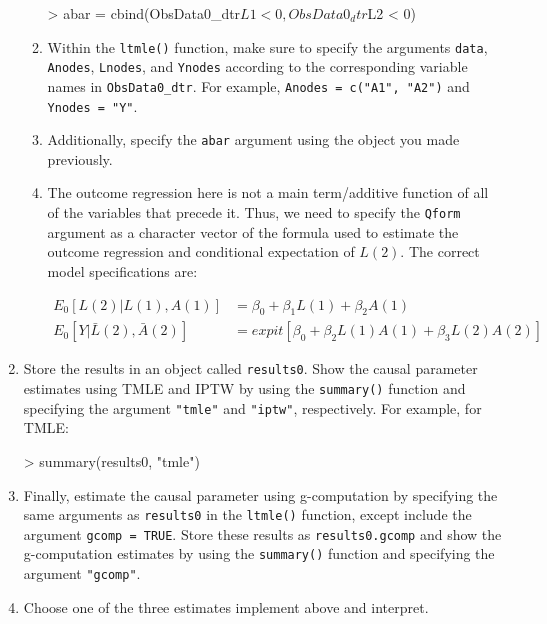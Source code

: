 \documentclass{exam}
\begin{document}
\begin{enumerate}
\begin{enumerate}
\begin{Schunk}
\begin{Sinput}
> abar = cbind(ObsData0_dtr$L1 < 0, ObsData0_dtr$L2 < 0)
\end{Sinput}
\end{Schunk}
\item Within the \texttt{ltmle()} function, make sure to specify the arguments \texttt{data}, \texttt{Anodes}, \texttt{Lnodes}, and \texttt{Ynodes} according to the corresponding variable names in \texttt{ObsData0\_dtr}. For example, \texttt{Anodes = c("A1", "A2")} and \texttt{Ynodes = "Y"}.
\item Additionally, specify the \texttt{abar} argument using the object you made previously.
\item The outcome regression here is not a main term/additive function of all of the variables that precede it. Thus, we need to specify the \texttt{Qform} argument as a character vector of the formula used to estimate the outcome regression and conditional expectation of $L(2)$. The correct model specifications are: 

\begin{align*}
E_0[L(2)|L(1), A(1)] & = \beta_0 + \beta_1L(1) + \beta_2A(1) \\
E_0[Y|\bar{L}(2), \bar{A}(2)] & = expit[\beta_0 + \beta_2L(1)A(1) + \beta_3L(2)A(2)] 
\end{align*}

\end{enumerate}
\item Store the results in an object called \texttt{results0}. Show the causal parameter estimates using TMLE and IPTW by using the \texttt{summary()} function and specifying the argument \texttt{"tmle"} and \texttt{"iptw"}, respectively. For example, for TMLE:
\begin{Schunk}
\begin{Sinput}
> summary(results0, "tmle")
\end{Sinput}
\end{Schunk}
\item Finally, estimate the causal parameter using g-computation by specifying the same arguments as \texttt{results0} in the \texttt{ltmle()} function, except include the argument \texttt{gcomp = TRUE}. Store these results as \texttt{results0.gcomp} and show the g-computation estimates by using the \texttt{summary()} function and specifying the argument \texttt{"gcomp"}.
\item Choose one of the three estimates implement above and interpret.
\end{enumerate}
\end{document}
